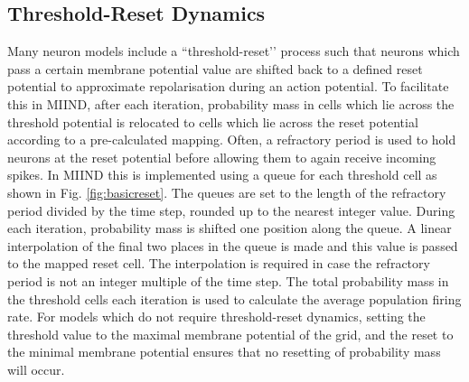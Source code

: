 \documentclass[utf8]{frontiersSCNS} %
\begin{document}
\subsection{Threshold-Reset Dynamics}
Many neuron models include a ``threshold-reset’’ process such that neurons which pass a certain membrane potential value are shifted back to a defined reset potential to approximate repolarisation during an action potential. To facilitate this in MIIND, after each iteration, probability mass in cells which lie across the threshold potential is relocated to cells which lie across the reset potential according to a pre-calculated mapping. Often, a refractory period is used to hold neurons at the reset potential before allowing them to again receive incoming spikes. In MIIND this is implemented using a queue for each threshold cell as shown in Fig. \ref{fig:basicreset}. The queues are set to the length of the refractory period divided by the time step, rounded up to the nearest integer value. During each iteration, probability mass is shifted one position along the queue. A linear interpolation of the final two places in the queue is made and this value is passed to the mapped reset cell. The interpolation is required in case the refractory period is not an integer multiple of the time step. The total probability mass in the threshold cells each iteration is used to calculate the average population firing rate. For models which do not require threshold-reset dynamics, setting the threshold value to the maximal membrane potential of the grid, and the reset to the minimal membrane potential ensures that no resetting of probability mass will occur.\\ 
\end{document}
